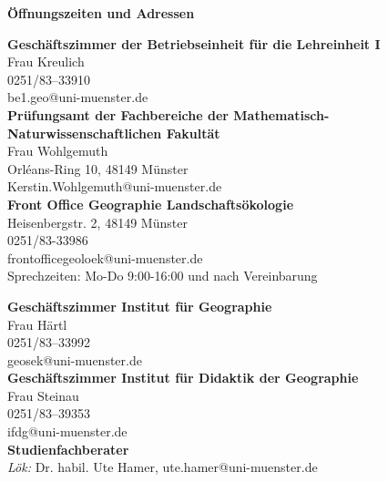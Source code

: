 \begin{center}
\textbf{ Öffnungszeiten und Adressen}
\end{center}
\begin{tiny}
\sffamily
\begin{minipage}[t]{0.5\textwidth}
 \begin{center}
\textbf{Geschäftszimmer der Betriebseinheit für die Lehreinheit I}\\
Frau Kreulich\\
0251/83--33910 \\
be1.geo@uni-muenster.de\\
\bigskip
\textbf{Prüfungsamt der Fachbereiche der Mathematisch- Naturwissenschaftlichen Fakultät}\\
Frau Wohlgemuth\\
Orléans-Ring 10, 48149 Münster\\
Kerstin.Wohlgemuth@uni-muenster.de\\
\bigskip
\textbf{Front Office Geographie Landschaftsökologie}\\
Heisenbergstr. 2, 48149 Münster\\
0251/83-33986\\
frontofficegeoloek@uni-muenster.de\\
Sprechzeiten: Mo-Do 9:00-16:00 und nach Vereinbarung
\bigskip
\end{center}
\end{minipage}
\begin{minipage}[t]{0.5\textwidth}
\begin{center}
 \textbf{Geschäftszimmer Institut für Geographie}\\
  Frau Härtl\\
  0251/83--33992\\
  geosek@uni-muenster.de\\
 \bigskip
\textbf{Geschäftszimmer Institut für Didaktik der Geographie}\\
Frau Steinau\\
0251/83--39353\\
ifdg@uni-muenster.de\\
\bigskip
\textbf{Studienfachberater}\\
\textit{Lök:} Dr. habil. Ute Hamer, ute.hamer@uni-muenster.de\\

\end{center}
\end{minipage}
\end{tiny}
